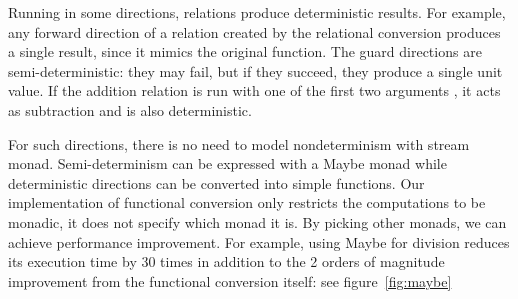 Running in some directions, relations produce deterministic results.
For example, any forward direction of a relation created by the relational conversion produces a single result, since it mimics the original function.
The guard directions are semi-deterministic: they may fail, but if they succeed, they produce a single unit value.
If the addition relation is run with one of the first two arguments \outm, it acts as subtraction and is also deterministic.

For such directions, there is no need to model nondeterminism with stream monad.
Semi-determinism can be expressed with a Maybe monad while deterministic directions can be converted into simple functions.
Our implementation of functional conversion only restricts the computations to be monadic, it does not specify which monad it is.
By picking other monads, we can achieve performance improvement. 
For example, using Maybe for division reduces its execution time by $30$ times in addition to the 2 orders of magnitude improvement from the functional conversion itself: see figure~\ref{fig:maybe}

